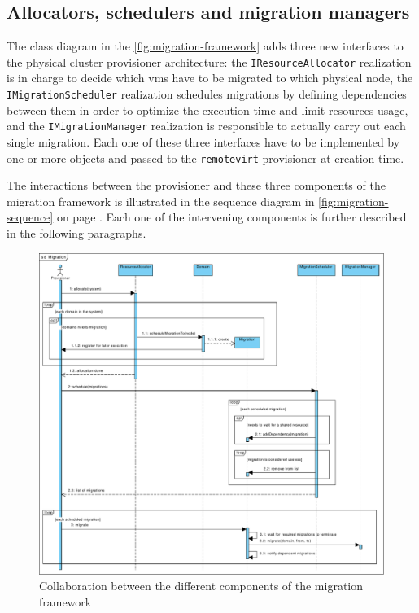 \subsection{Allocators, schedulers and migration managers}

The class diagram in the \autoref{fig:migration-framework} adds three new interfaces to the physical cluster provisioner architecture: the \texttt{IResourceAllocator} realization is in charge to decide which \glspl{vm} have to be migrated to which physical node, the \texttt{IMigrationScheduler} realization schedules migrations by defining dependencies between them in order to optimize the execution time and limit resources usage, and the \texttt{IMigrationManager} realization is responsible to actually carry out each single migration. Each one of these three interfaces have to be implemented by one or more objects and passed to the \texttt{remotevirt} provisioner at creation time.

The interactions between the provisioner and these three components of the migration framework is illustrated in the sequence diagram in \autoref{fig:migration-sequence} on page \pageref{fig:migration-sequence}. Each one of the intervening components is further described in the following paragraphs.

\begin{figure}[h]
	\centering
	\includegraphics[width=1\textwidth]{figures/migration-sequence}
	\caption{Collaboration between the different components of the migration framework}
	\label{fig:migration-sequence}
\end{figure}

